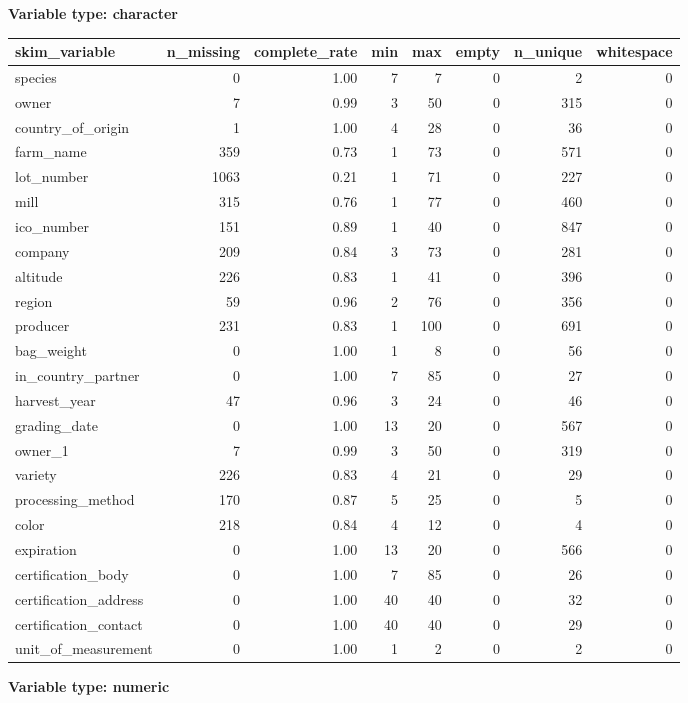\documentclass[
]{article}
\begin{document}
\textbf{Variable type: character}

\begin{longtable}[]{@{}lrrrrrrr@{}}
\toprule
skim\_variable & n\_missing & complete\_rate & min & max & empty &
n\_unique & whitespace \\
\midrule
\endhead
species & 0 & 1.00 & 7 & 7 & 0 & 2 & 0 \\
owner & 7 & 0.99 & 3 & 50 & 0 & 315 & 0 \\
country\_of\_origin & 1 & 1.00 & 4 & 28 & 0 & 36 & 0 \\
farm\_name & 359 & 0.73 & 1 & 73 & 0 & 571 & 0 \\
lot\_number & 1063 & 0.21 & 1 & 71 & 0 & 227 & 0 \\
mill & 315 & 0.76 & 1 & 77 & 0 & 460 & 0 \\
ico\_number & 151 & 0.89 & 1 & 40 & 0 & 847 & 0 \\
company & 209 & 0.84 & 3 & 73 & 0 & 281 & 0 \\
altitude & 226 & 0.83 & 1 & 41 & 0 & 396 & 0 \\
region & 59 & 0.96 & 2 & 76 & 0 & 356 & 0 \\
producer & 231 & 0.83 & 1 & 100 & 0 & 691 & 0 \\
bag\_weight & 0 & 1.00 & 1 & 8 & 0 & 56 & 0 \\
in\_country\_partner & 0 & 1.00 & 7 & 85 & 0 & 27 & 0 \\
harvest\_year & 47 & 0.96 & 3 & 24 & 0 & 46 & 0 \\
grading\_date & 0 & 1.00 & 13 & 20 & 0 & 567 & 0 \\
owner\_1 & 7 & 0.99 & 3 & 50 & 0 & 319 & 0 \\
variety & 226 & 0.83 & 4 & 21 & 0 & 29 & 0 \\
processing\_method & 170 & 0.87 & 5 & 25 & 0 & 5 & 0 \\
color & 218 & 0.84 & 4 & 12 & 0 & 4 & 0 \\
expiration & 0 & 1.00 & 13 & 20 & 0 & 566 & 0 \\
certification\_body & 0 & 1.00 & 7 & 85 & 0 & 26 & 0 \\
certification\_address & 0 & 1.00 & 40 & 40 & 0 & 32 & 0 \\
certification\_contact & 0 & 1.00 & 40 & 40 & 0 & 29 & 0 \\
unit\_of\_measurement & 0 & 1.00 & 1 & 2 & 0 & 2 & 0 \\
\bottomrule
\end{longtable}

\textbf{Variable type: numeric}
\end{document}
